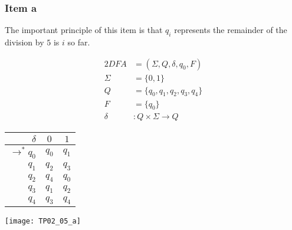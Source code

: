 {\subsubsection{Item a}
The important principle of this item is that $q_i$ represents the remainder of the division by $5$ is $i$ so far.
\begin{center}
	\begin{minipage}[c]{0.25\textwidth}
		\begin{alignat*}{2}
			DFA    &= (\Sigma, Q, \delta, q_0, F)\\
			\Sigma &= \{0,1\}\\
			Q      &= \{q_0,q_1,q_2,q_3,q_4\}\\
			F      &= \{q_0\}\\
			\delta &\colon Q \times \Sigma \rightarrow Q
		\end{alignat*}
	\end{minipage}
	\begin{minipage}[c]{0.2\textwidth}
		\begin{center}
		\begin{tabular}{ r | c c }
 			$\delta              $ & $0  $ & $1  $ \\ \hline
 			$\rightarrow^\ast q_0$ & $q_0$ & $q_1$ \\  
 			$                 q_1$ & $q_2$ & $q_3$ \\
 			$                 q_2$ & $q_4$ & $q_0$ \\
 			$                 q_3$ & $q_1$ & $q_2$ \\
 			$                 q_4$ & $q_3$ & $q_4$
		\end{tabular}
		\end{center}
	\end{minipage}
	\begin{minipage}[c]{0.45\textwidth}
		\begin{center} \texttt{[image: TP02\_05\_a]} \end{center}
	\end{minipage}
\end{center}
}
